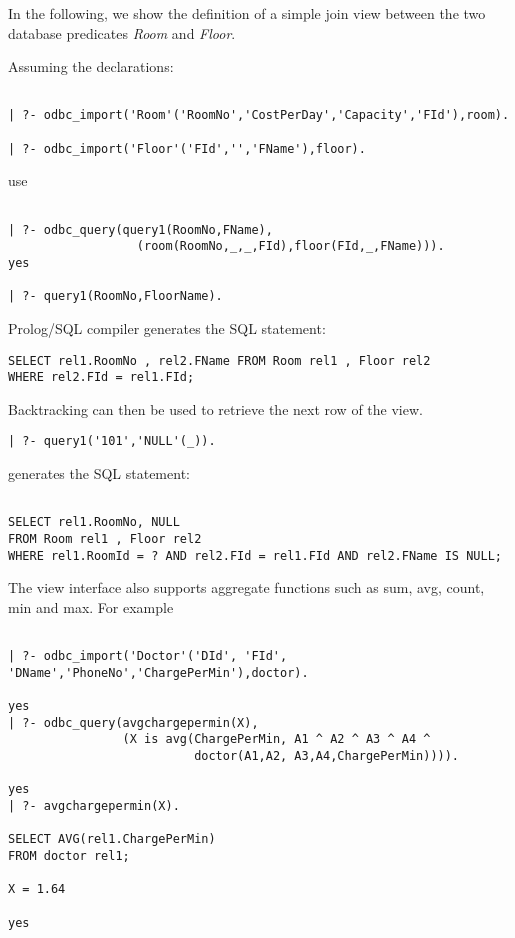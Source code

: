 In the following, we show the definition of a simple join view between the 
two database predicates {\it Room} and {\it Floor}.

Assuming the declarations:
\begin{verbatim}

| ?- odbc_import('Room'('RoomNo','CostPerDay','Capacity','FId'),room).

| ?- odbc_import('Floor'('FId','','FName'),floor).
\end{verbatim}

use

\begin{verbatim}

| ?- odbc_query(query1(RoomNo,FName),
                  (room(RoomNo,_,_,FId),floor(FId,_,FName))).
yes

| ?- query1(RoomNo,FloorName).
\end{verbatim}

Prolog/SQL compiler generates the SQL statement:
\begin{verbatim}
SELECT rel1.RoomNo , rel2.FName FROM Room rel1 , Floor rel2 
WHERE rel2.FId = rel1.FId;
\end{verbatim}

Backtracking can then be used to retrieve the next row of the view.
\begin{verbatim}
| ?- query1('101','NULL'(_)).
\end{verbatim}

generates the SQL statement:
\begin{verbatim}

SELECT rel1.RoomNo, NULL
FROM Room rel1 , Floor rel2
WHERE rel1.RoomId = ? AND rel2.FId = rel1.FId AND rel2.FName IS NULL;
\end{verbatim}

The view interface also supports aggregate functions such as sum, avg,
count, min and max.  For example
\begin{verbatim}

| ?- odbc_import('Doctor'('DId', 'FId', 'DName','PhoneNo','ChargePerMin'),doctor).

yes
| ?- odbc_query(avgchargepermin(X),
                (X is avg(ChargePerMin, A1 ^ A2 ^ A3 ^ A4 ^ 
                          doctor(A1,A2, A3,A4,ChargePerMin)))).

yes
| ?- avgchargepermin(X).

SELECT AVG(rel1.ChargePerMin)
FROM doctor rel1;

X = 1.64

yes
\end{verbatim}

